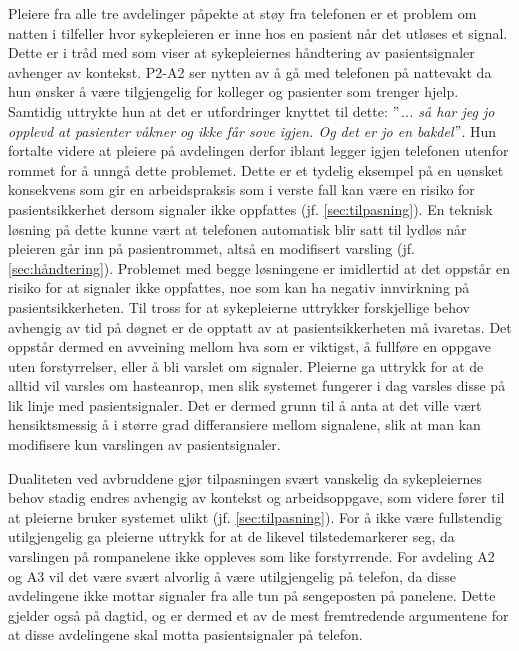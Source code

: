 \noindent
Pleiere fra alle tre avdelinger påpekte at støy fra telefonen er et problem om natten i tilfeller hvor sykepleieren er inne hos en pasient når det utløses et signal. Dette er i tråd med \citet{klemets13} som viser at sykepleiernes håndtering av pasientsignaler avhenger av kontekst. P2-A2 ser nytten av å gå med telefonen på nattevakt da hun ønsker å være tilgjengelig for kolleger og pasienter som trenger hjelp. Samtidig uttrykte hun at det er utfordringer knyttet til dette: \textit{ $"$... så har jeg jo opplevd at pasienter våkner og ikke får sove igjen. Og det er jo en bakdel$"$}. Hun fortalte videre at pleiere på avdelingen derfor iblant legger igjen telefonen utenfor rommet for å unngå dette problemet. Dette er et tydelig eksempel på en uønsket konsekvens som gir en arbeidspraksis som i verste fall kan være en risiko for pasientsikkerhet dersom signaler ikke oppfattes (jf. \ref{sec:tilpasning}). En teknisk løsning på dette kunne vært at telefonen automatisk blir satt til lydløs når pleieren går inn på pasientrommet, altså en modifisert varsling (jf. \ref{sec:håndtering}). Problemet med begge løsningene er imidlertid at det oppstår en risiko for at signaler ikke oppfattes, noe som kan ha negativ innvirkning på pasientsikkerheten. Til tross for at sykepleierne uttrykker forskjellige behov avhengig av tid på døgnet er de opptatt av at pasientsikkerheten må ivaretas. Det oppstår dermed en avveining mellom hva som er viktigst, å fullføre en oppgave uten forstyrrelser, eller å bli varslet om signaler. Pleierne ga uttrykk for at de alltid vil varsles om hasteanrop, men slik systemet fungerer i dag varsles disse på lik linje med pasientsignaler. Det er dermed grunn til å anta at det ville vært hensiktsmessig å i større grad differansiere mellom signalene, slik at man kan modifisere kun varslingen av pasientsignaler.

\noindent
Dualiteten ved avbruddene gjør tilpasningen svært vanskelig da sykepleiernes behov stadig endres avhengig av kontekst og arbeidsoppgave, som videre fører til at pleierne bruker systemet ulikt (jf. \ref{sec:tilpasning}). For å ikke være fullstendig utilgjengelig ga pleierne uttrykk for at de likevel tilstedemarkerer seg, da varslingen på rompanelene ikke oppleves som like forstyrrende. For avdeling A2 og A3 vil det være svært alvorlig å være utilgjengelig på telefon, da disse avdelingene ikke mottar signaler fra alle tun på sengeposten på panelene. Dette gjelder også på dagtid, og er dermed et av de mest fremtredende argumentene for at disse avdelingene skal motta pasientsignaler på telefon. 

